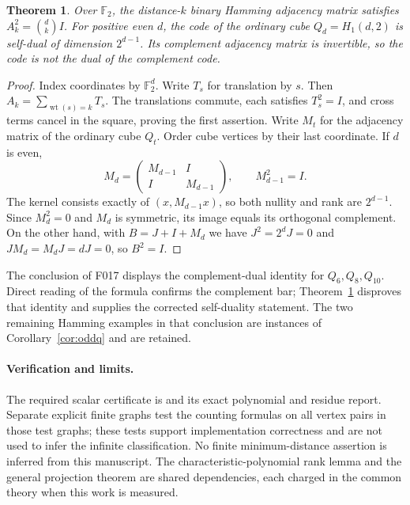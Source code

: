 \documentclass[11pt]{article}
\newtheorem{theorem}{Theorem}
\newcommand{\wt}{\operatorname{wt}}
\begin{document}
\begin{theorem}\label{thm:cube}
Over $\mathbb F_2$, the distance-$k$ binary Hamming adjacency matrix satisfies
$A_k^2=\binom dk I$. For positive even $d$, the code of the ordinary cube
$Q_d=H_1(d,2)$ is self-dual of dimension $2^{d-1}$. Its complement adjacency
matrix is invertible, so the code is not the dual of the complement code.
\end{theorem}
\begin{proof}
Index coordinates by $\mathbb F_2^d$. Write $T_s$ for translation by $s$.
Then $A_k=\sum_{\wt(s)=k}T_s$. The translations commute, each satisfies
$T_s^2=I$, and cross terms cancel in the square, proving the first assertion.
Write $M_t$ for the adjacency matrix of the ordinary cube $Q_t$.
Order cube vertices by their last coordinate. If $d$ is even,
\[
 M_d=\begin{pmatrix}M_{d-1}&I\\I&M_{d-1}\end{pmatrix},\qquad
 M_{d-1}^2=I.
\]
The kernel consists exactly of $(x,M_{d-1}x)$, so both nullity and rank are
$2^{d-1}$. Since $M_d^2=0$ and $M_d$ is symmetric, its image equals its
orthogonal complement. On the other hand, with $B=J+I+M_d$ we have
$J^2=2^dJ=0$ and $JM_d=M_dJ=dJ=0$, so $B^2=I$.
\end{proof}

The conclusion of F017 displays the complement-dual identity for
$Q_6,Q_8,Q_{10}$. Direct reading of the formula confirms the complement bar;
Theorem~\ref{thm:cube} disproves that identity and supplies the corrected
self-duality statement. The two remaining Hamming examples in that
conclusion are instances of Corollary~\ref{cor:oddq} and are retained.

\paragraph{Verification and limits.}
The required scalar certificate is  and
its exact polynomial and residue report. Separate explicit finite graphs
test the counting formulas on all vertex pairs in those test graphs;
these tests support implementation correctness and are not used to infer
the infinite classification. No finite minimum-distance assertion is
inferred from this manuscript. The characteristic-polynomial rank lemma
and the general projection theorem are shared dependencies, each charged
in the common theory when this work is measured.
\end{document}
